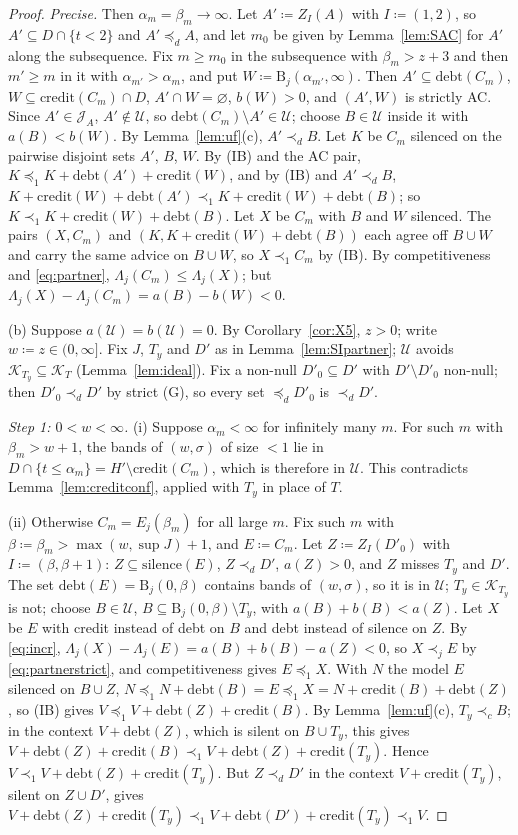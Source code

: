 \documentclass[11pt]{article}
\theoremstyle{definition}\newtheorem{definition}[theorem]{Definition}
\theoremstyle{remark}\newtheorem{remark}[theorem]{Remark}
\newcommand{\debt}{\mathrm{debt}}
\newcommand{\cred}{\mathrm{credit}}
\newcommand{\sil}{\mathrm{silence}}
\newcommand{\Band}{\mathrm{B}}
\newcommand{\Jid}{\mathcal J}
\newcommand{\Kid}{\mathcal K}
\newcommand{\Uf}{\mathcal U}
\begin{document}
\begin{proof}
\emph{Precise.} Then $\alpha_m=\beta_m\to\infty$. Let $A'\coloneqq Z_I(A)$
with $I\coloneqq(1,2)$, so $A'\subseteq D\cap\{t<2\}$ and $A'\preceq_dA$, and
let $m_0$ be given by Lemma~\ref{lem:SAC} for $A'$ along the subsequence. Fix
$m\ge m_0$ in the subsequence with $\beta_m>z+3$ and then $m'\ge m$ in it
with $\alpha_{m'}>\alpha_m$, and put $W\coloneqq\Band_j(\alpha_{m'},\infty)$.
Then $A'\subseteq\debt(C_m)$, $W\subseteq\cred(C_m)\cap D$, $A'\cap W=\varnothing$, $b(W)>0$, and $(A',W)$
is strictly AC. Since $A'\in\Jid_A$, $A'\notin\Uf$, so
$\debt(C_m)\setminus A'\in\Uf$; choose $B\in\Uf$ inside it with
$a(B)<b(W)$. By Lemma~\ref{lem:uf}(c), $A'\prec_dB$. Let $K$ be $C_m$
silenced on the pairwise disjoint sets $A'$, $B$, $W$. By (IB) and the AC
pair, $K\preceq_1K+\debt(A')+\cred(W)$, and by (IB) and $A'\prec_dB$,
$K+\cred(W)+\debt(A')\prec_1K+\cred(W)+\debt(B)$; so
$K\prec_1K+\cred(W)+\debt(B)$. Let $X$ be $C_m$ with $B$ and $W$ silenced.
The pairs $(X,C_m)$ and $(K,K+\cred(W)+\debt(B))$ each agree off $B\cup W$
and carry the same advice on $B\cup W$, so $X\prec_1C_m$ by (IB). By
competitiveness and \eqref{eq:partner}, $\Lambda_j(C_m)\le\Lambda_j(X)$; but
$\Lambda_j(X)-\Lambda_j(C_m)=a(B)-b(W)<0$.

(b) Suppose $a(\Uf)=b(\Uf)=0$. By Corollary~\ref{cor:X5}, $z>0$; write
$w\coloneqq z\in(0,\infty]$. Fix $J$, $T_y$ and $D'$ as in
Lemma~\ref{lem:SIpartner}; $\Uf$ avoids $\Kid_{T_y}\subseteq\Kid_T$
(Lemma~\ref{lem:ideal}). Fix a non-null $D'_0\subseteq D'$ with
$D'\setminus D'_0$ non-null; then $D'_0\prec_dD'$ by strict (G), so every set
$\preceq_dD'_0$ is $\prec_dD'$.

\emph{Step 1: $0<w<\infty$.} (i) Suppose $\alpha_m<\infty$ for infinitely
many $m$. For such $m$ with $\beta_m>w+1$, the bands of $(w,\sigma)$ of size
$<1$ lie in $D\cap\{t\le\alpha_m\}=H'\setminus\cred(C_m)$, which is
therefore in $\Uf$. This contradicts Lemma~\ref{lem:creditconf}, applied
with $T_y$ in place of $T$.

(ii) Otherwise $C_m=E_j(\beta_m)$ for all large $m$. Fix such $m$ with
$\beta\coloneqq\beta_m>\max(w,\sup J)+1$, and $E\coloneqq C_m$. Let
$Z\coloneqq Z_I(D'_0)$ with $I\coloneqq(\beta,\beta+1)$: $Z\subseteq\sil(E)$,
$Z\prec_dD'$, $a(Z)>0$, and $Z$ misses $T_y$ and $D'$. The set
$\debt(E)=\Band_j(0,\beta)$ contains bands of $(w,\sigma)$, so it is in
$\Uf$; $T_y\in\Kid_{T_y}$ is not; choose $B\in\Uf$,
$B\subseteq\Band_j(0,\beta)\setminus T_y$, with $a(B)+b(B)<a(Z)$. Let $X$
be $E$ with credit instead of debt on $B$ and debt instead of silence on
$Z$. By \eqref{eq:incr}, $\Lambda_j(X)-\Lambda_j(E)=a(B)+b(B)-a(Z)<0$, so
$X\prec_jE$ by \eqref{eq:partnerstrict}, and competitiveness gives
$E\preceq_1X$. With $N$ the model $E$ silenced on $B\cup Z$,
$N\preceq_1N+\debt(B)=E\preceq_1X=N+\cred(B)+\debt(Z)$, so (IB) gives
$V\preceq_1V+\debt(Z)+\cred(B)$. By Lemma~\ref{lem:uf}(c), $T_y\prec_cB$;
in the context $V+\debt(Z)$, which is silent on $B\cup T_y$, this gives
$V+\debt(Z)+\cred(B)\prec_1V+\debt(Z)+\cred(T_y)$. Hence
$V\prec_1V+\debt(Z)+\cred(T_y)$. But $Z\prec_dD'$ in the context
$V+\cred(T_y)$, silent on $Z\cup D'$, gives
$V+\debt(Z)+\cred(T_y)\prec_1V+\debt(D')+\cred(T_y)\prec_1V$.


\end{proof}
\end{document}
